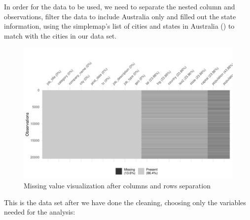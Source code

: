 \documentclass[11pt,a4paper,]{article}
\begin{document}
In order for the data to be used, we need to separate the nested column and observations, filter the data to include Australia only and filled out the state information, using the simplemap's list of cities and states in Australia (\textcite{simplemaps_2019}) to match with the cities in our data set.

\begin{figure}
\centering
\includegraphics{Team_JHDP_Assignment4_files/figure-latex/state-clean-1.pdf}
\caption{\label{fig:state-clean}Missing value visualization after columns and rows separation}
\end{figure}

This is the data set after we have done the cleaning, choosing only the variables needed for the analysis:
\end{document}
